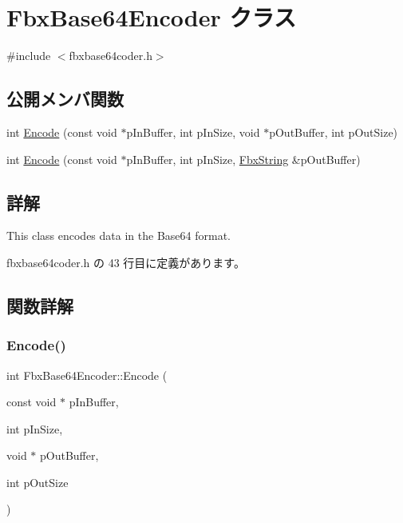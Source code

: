 \hypertarget{class_fbx_base64_encoder}{}\section{Fbx\+Base64\+Encoder クラス}
\label{class_fbx_base64_encoder}


{\ttfamily \#include $<$fbxbase64coder.\+h$>$}

\subsection*{公開メンバ関数}
\begin{DoxyCompactItemize}
\item 
int \hyperlink{class_fbx_base64_encoder_a53124f67f78035c7c024da2ee7ba2063}{Encode} (const void $\ast$p\+In\+Buffer, int p\+In\+Size, void $\ast$p\+Out\+Buffer, int p\+Out\+Size)
\item 
int \hyperlink{class_fbx_base64_encoder_afe16a82c30d642c73f78df4d648765c8}{Encode} (const void $\ast$p\+In\+Buffer, int p\+In\+Size, \hyperlink{class_fbx_string}{Fbx\+String} \&p\+Out\+Buffer)
\end{DoxyCompactItemize}


\subsection{詳解}
This class encodes data in the Base64 format. 

 fbxbase64coder.\+h の 43 行目に定義があります。



\subsection{関数詳解}
\mbox{\label{class_fbx_base64_encoder_a53124f67f78035c7c024da2ee7ba2063}} 
\subsubsection{\texorpdfstring{Encode()}{Encode()}\hspace{0.1cm}{\footnotesize\ttfamily [1/2]}}
{\footnotesize\ttfamily int Fbx\+Base64\+Encoder\+::\+Encode (\begin{DoxyParamCaption}\item[{const void $\ast$}]{p\+In\+Buffer,  }\item[{int}]{p\+In\+Size,  }\item[{void $\ast$}]{p\+Out\+Buffer,  }\item[{int}]{p\+Out\+Size }\end{DoxyParamCaption})}

